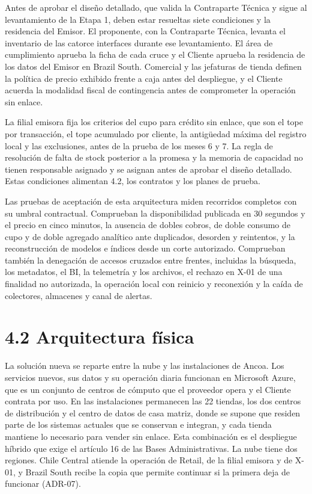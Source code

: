\documentclass[11pt]{article}
\begin{document}
Antes de aprobar el diseño detallado, que valida la Contraparte Técnica y sigue al levantamiento de la Etapa 1, deben estar resueltas siete condiciones y la residencia del Emisor. El proponente, con la Contraparte Técnica, levanta el inventario de las catorce interfaces durante ese levantamiento. El área de cumplimiento aprueba la ficha de cada cruce y el Cliente aprueba la residencia de los datos del Emisor en Brazil South. Comercial y las jefaturas de tienda definen la política de precio exhibido frente a caja antes del despliegue, y el Cliente acuerda la modalidad fiscal de contingencia antes de comprometer la operación sin enlace.

La filial emisora fija los criterios del cupo para crédito sin enlace, que son el tope por transacción, el tope acumulado por cliente, la antigüedad máxima del registro local y las exclusiones, antes de la prueba de los meses 6 y 7. La regla de resolución de falta de stock posterior a la promesa y la memoria de capacidad no tienen responsable asignado y se asignan antes de aprobar el diseño detallado. Estas condiciones alimentan 4.2, los contratos y los planes de prueba.

Las pruebas de aceptación de esta arquitectura miden recorridos completos con su umbral contractual. Comprueban la disponibilidad publicada en 30 segundos y el precio en cinco minutos, la ausencia de dobles cobros, de doble consumo de cupo y de doble agregado analítico ante duplicados, desorden y reintentos, y la reconstrucción de modelos e índices desde un corte autorizado. Comprueban también la denegación de accesos cruzados entre frentes, incluidas la búsqueda, los metadatos, el BI, la telemetría y los archivos, el rechazo en X-01 de una finalidad no autorizada, la operación local con reinicio y reconexión y la caída de colectores, almacenes y canal de alertas.

\section{4.2 Arquitectura física}

La solución nueva se reparte entre la nube y las instalaciones de Ancoa. Los servicios nuevos, sus datos y su operación diaria funcionan en Microsoft Azure, que es un conjunto de centros de cómputo que el proveedor opera y el Cliente contrata por uso. En las instalaciones permanecen las 22 tiendas, los dos centros de distribución y el centro de datos de casa matriz, donde se supone que residen parte de los sistemas actuales que se conservan e integran, y cada tienda mantiene lo necesario para vender sin enlace. Esta combinación es el despliegue híbrido que exige el artículo 16 de las Bases Administrativas. La nube tiene dos regiones. Chile Central atiende la operación de Retail, de la filial emisora y de X-01, y Brazil South recibe la copia que permite continuar si la primera deja de funcionar (ADR-07).
\end{document}
